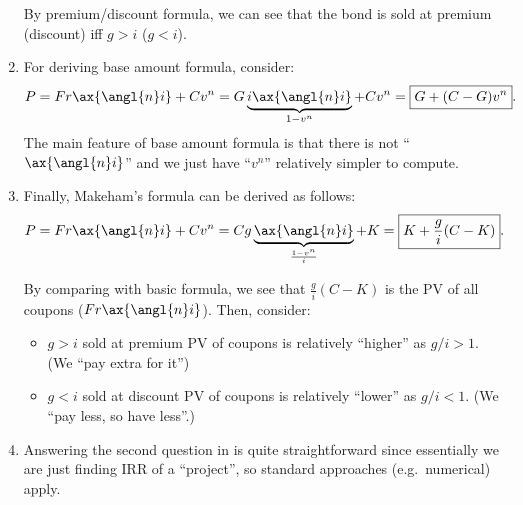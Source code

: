 \begin{enumerate}
\begin{note}
By premium/discount formula, we can see that the bond is sold at premium (discount) iff \(g>i\) (\(g<i\)).
\end{note}

\item \label{it:bond-base-amt-fmla}
For deriving base amount formula, consider:
\[
P=Fr\ax{\angl{n}i}+Cv^n
=G\underbrace{i\ax{\angl{n}i}}_{1-v^n}+Cv^n
=\boxed{G+(C-G)v^n}.
\]
The main feature of base amount formula is that there is not
``\(\ax{\angl{n}i}\)'' and we just have ``\(v^n\)'' 
relatively simpler to compute.
\item \label{it:bond-makeham-fmla}
Finally, Makeham's formula can be derived as follows:
\[
P=Fr\ax{\angl{n}i}+Cv^n
=Cg\underbrace{\ax{\angl{n}i}}_{\mathclap{\frac{1-v^n}{i}}}+K
=\boxed{K+\frac{g}{i}(C-K)}.
\]
\begin{intuition}
By comparing with basic formula, we see that \(\displaystyle \frac{g}{i}(C-K)\)
is the PV of all coupons (\(Fr\ax{\angl{n}i}\)). Then, consider:
\begin{itemize}
\item \(g>i\)  sold at premium  PV of coupons is relatively ``higher'' as \(g/i>1\). (We ``pay extra for it'')
\item \(g<i\)  sold at discount  PV of coupons is relatively ``lower'' as \(g/i<1\). (We ``pay less, so have less''.)
\end{itemize}
\end{intuition}
\item Answering the second question in  is quite
straightforward since essentially we are just finding IRR of a ``project'', so
standard approaches (e.g.\ numerical) apply.
\end{enumerate}
